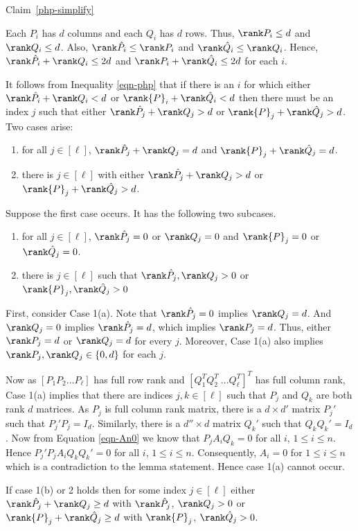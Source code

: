 \begin{proofof}{Claim~\ref{php-simplify}}

Each $P_i$ has $d$ columns and each $Q_i$ has $d$ rows. Thus, $\rank
P_i\le d$ and $\rank Q_i\le d$. Also, $\rank \hat{P}_i \leq \rank P_i$
and $\rank \hat{Q}_i \leq \rank Q_i$. Hence, $\rank \hat{P}_i + \rank
Q_i\le 2d$ and $\rank P_i + \rank \hat{Q}_i\le 2d$ for each $i$.

It follows from Inequality \ref{eqn-php} that if there is an $i$ for
which either $\rank \hat{P}_i + \rank Q_i <d$ or $\rank {P}_i + \rank
\hat{Q}_i< d$ then there must be an index $j$ such that either $\rank
\hat{P}_j + \rank Q_j > d$ or $\rank {P}_j + \rank \hat{Q}_j > d$. Two
cases arise:

\begin{enumerate}
\item for all $j\in [\ell]$, $\rank \hat{P}_j + \rank Q_j = d$ and
  $\rank {P}_j + \rank \hat{Q}_j = d$.
\item there is $j \in [\ell]$ with either $\rank \hat{P}_j + \rank Q_j
  > d$ or $\rank {P}_j + \rank \hat{Q}_j > d$.
\end{enumerate}

Suppose the first case occurs. It has the following two subcases.

\begin{enumerate}
\item[(a)] for all $j \in[\ell]$, $\rank \hat{P}_j=0$ or $\rank Q_j = 0$ and $\rank {P}_j=0$ or $\rank \hat{Q}_j=0$.
\item[(b)] there is $j\in [\ell]$ such that $\rank \hat{P}_j, \rank
  Q_j >0$ or $\rank {P}_j, \rank \hat{Q}_j> 0$
\end{enumerate}

First, consider Case 1(a). Note that $\rank \hat{P}_j=0$ implies
$\rank Q_j =d$. And $\rank Q_j=0$ implies $\rank \hat{P}_j=d$, which
implies $\rank P_j =d$. Thus, either $\rank P_j =d$ or $\rank Q_j =d$
for every $j$. Moreover, Case 1(a) also implies $\rank P_j, \rank
Q_j\in \{0,d\}$ for each $j$.

Now as $[P_1 P_2 \ldots P_\ell]$ has full row rank and $[Q_1^T
  Q_2^T~\ldots Q_\ell^T]^T$ has full column rank, Case 1(a) implies
that there are indices $j,k \in [\ell]$ such that $P_j$ and $Q_k$ are
both rank $d$ matrices. As $P_j$ is full column rank matrix, there is
a $d \times d'$ matrix $P_j'$ such that $P_j' P_j = I_d$. Similarly,
there is a $d'' \times d$ matrix $Q_k'$ such that $Q_k Q_k'=I_d$. Now
from Equation \ref{eqn-An0} we know that $P_j A_i Q_k = 0$ for all
$i$, $1\leq i \leq n$. Hence $P_j' P_j A_i Q_k Q_k' = 0$ for all $i$,
$1\leq i \leq n$. Consequently, $A_i=0$ for $1\le i\le n$ which is a
contradiction to the lemma statement. Hence case 1(a) cannot occur.

If case 1(b) or 2 holds then for some index $j\in [\ell]$ either
$\rank \hat{P}_j + \rank Q_j \geq d$ with $\rank \hat{P}_j$, $\rank
Q_j >0$ or $\rank {P}_j + \rank \hat{Q}_j \geq d$ with $\rank {P}_j$,
$\rank \hat{Q}_j>0$. 
\end{proofof}
